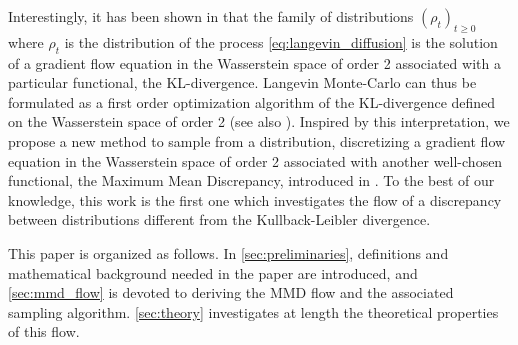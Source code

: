 Interestingly, it has been shown in \cite{jordan1998variational} that the family of distributions $(\rho_t)_{t\ge 0}$ where $\rho_t$ is the distribution of the process \eqref{eq:langevin_diffusion} is the solution of a gradient
flow equation in the Wasserstein space of order 2 associated with a particular functional, the KL-divergence. Langevin Monte-Carlo can thus be formulated as a first order optimization algorithm of the KL-divergence defined on the Wasserstein space of order 2 (see also \cite{durmus2018analysis,bernton2018langevin}). Inspired by this interpretation, we propose a new method to sample from a distribution, discretizing a gradient
flow equation in the Wasserstein space of order 2 associated with another well-chosen functional, the Maximum Mean Discrepancy, introduced in \cite{gretton2012kernel}. To the best of our knowledge, this work is the first one which investigates the flow of a discrepancy between distributions different from the Kullback-Leibler divergence. 


This paper is organized as follows. In \cref{sec:preliminaries}, definitions and mathematical background needed in the paper are introduced, and \cref{sec:mmd_flow} is devoted to deriving the MMD flow and the associated sampling algorithm.
\cref{sec:theory} investigates at length the theoretical properties of this flow. 
